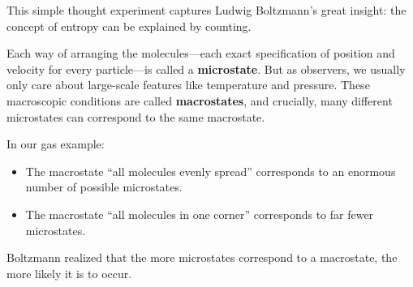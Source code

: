 This simple thought experiment captures Ludwig Boltzmann’s great insight: the concept of entropy can be explained by counting.

Each way of arranging the molecules—each exact specification of position and velocity for every particle—is called a \textbf{microstate}. But as observers, we usually only care about large-scale features like temperature and pressure. These macroscopic conditions are called \textbf{macrostates}, and crucially, many different microstates can correspond to the same macrostate.

In our gas example:
\begin{itemize}
  \item The macrostate “all molecules evenly spread” corresponds to an enormous number of possible microstates.
  \item The macrostate “all molecules in one corner” corresponds to far fewer microstates.
\end{itemize}

Boltzmann realized that the more microstates correspond to a macrostate, the more likely it is to occur. 






